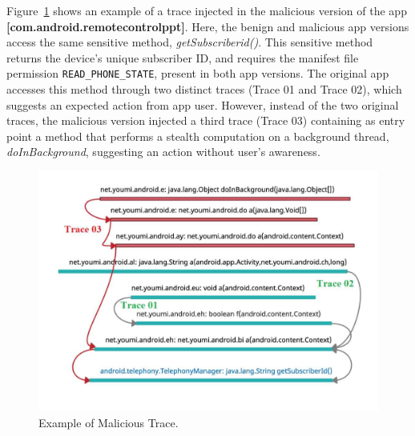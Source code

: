 Figure~\ref{fig:maliciousTrace} shows an example of a trace injected in the malicious version of the
app \textbf{[com.android.remotecontrolppt]}. Here, the benign and malicious app versions access the same
sensitive method, \textit{getSubscriberid()}. This sensitive method returns the device's unique
subscriber ID, and requires the manifest file permission \texttt{READ\_PHONE\_STATE}, present in both app versions.
The original app accesses this method through two distinct traces (Trace 01 and Trace 02), which suggests an expected action from app user. However,
instead of the two original traces, the malicious version injected a third trace (Trace 03) containing as entry point a method that performs a stealth
computation on a background thread, \textit{doInBackground}, suggesting an action without user's awareness.


\begin{figure}
\centering
\includegraphics[scale=0.28]{images/maliciousTrace_example01.pdf}
\caption{Example of Malicious Trace.}
 \label{fig:maliciousTrace}
\end{figure}
